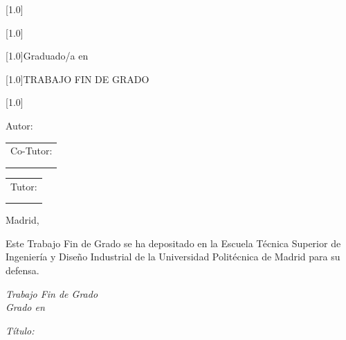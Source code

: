\begin{titlepage}
{\begin{center}
    \scalebox{.7}[1.0]{\huge{\MakeUppercase{\Universidad}}} \vspace*{1cm}

    \scalebox{.7}[1.0]{\huge{\MakeUppercase{\Centro}}} \vspace*{0.8cm}
    
    \scalebox{.7}[1.0]{\LARGE{Graduado/a en \Grado}} \vspace*{0.25cm}

    \scalebox{.7}[1.0]{\Huge{TRABAJO FIN DE GRADO}} \vspace*{2.0cm}

    \scalebox{.7}[1.0]{\LARGE{\textbf{\TituloTFG}}} \vspace*{2.0cm}

    \LARGE{Autor: \NombreAutor}

  \end{center}

    }

  \begin{minipage}{0.1\linewidth}
    \hspace*{-1.5cm}
    \noindent
    \begin{tabular}{l}
      Co-Tutor: \\
      \NombreCoTutor{} \\
      \DepartamentoCoTutor{}
    \end{tabular}
  \end{minipage}
  \begin{minipage}{0.4\linewidth}
    \begin{center}
      \qquad
    \end{center}
  \end{minipage}
  \begin{minipage}{0.1\linewidth}
    \noindent
    \begin{tabular}{l}
      Tutor: \\
      \NombreTutor{} \\
      \DepartamentoTutor{}
    \end{tabular}
  \end{minipage}

  \begin{flushright}
    \vspace*{\fill}
    Madrid, \FechaLectura
  \end{flushright}

  \newpage
  \thispagestyle{empty}
  \noindent
  Este Trabajo Fin de Grado se ha depositado en la Escuela Técnica Superior de Ingeniería y Diseño Industrial de la Universidad Politécnica de Madrid para su defensa.

  \vspace*{4cm}
  \noindent
  \textit{Trabajo Fin de Grado}\\
  \textit{Grado en} \Grado{}
  
  \textit{Título:} \TituloTFG{}

  \FechaLectura

  \vspace*{3cm}

\end{titlepage}
